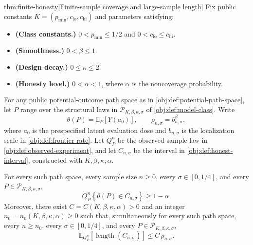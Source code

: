 \documentclass[11pt]{article}
\begin{document}
\begin{theoremv}{thm:finite-honesty}[Finite-sample coverage and large-sample length]
Fix public constants \(K=(p_{\min},c_{\mathrm{lo}},c_{\mathrm{hi}})\) and parameters satisfying:
\begin{itemize}
\item \textbf{(Class constants.)} \(0<p_{\min}\le 1/2\) and \(0<c_{\mathrm{lo}}\le c_{\mathrm{hi}}\).
\item \textbf{(Smoothness.)} \(0<\beta\le 1\).
\item \textbf{(Design decay.)} \(0\le\kappa\le 2\).
\item \textbf{(Honesty level.)} \(0<\alpha<1\), where \(\alpha\) is the noncoverage probability.
\end{itemize}
For any public potential-outcome path space as in \cref{obj:def:potential-path-space}, let \(P\) range over the structural laws in \(\mathcal P_{K,\beta,\kappa,\sigma}\) of \cref{obj:def:model-class}. Write
\[
\theta(P)=\mathbb E_P[Y(a_0)],
\qquad
\rho_{n,\sigma}=b_{n,\sigma}^{\beta},
\]
where \(a_0\) is the prespecified latent evaluation dose and \(b_{n,\sigma}\) is the localization scale in \cref{obj:def:frontier-rate}. Let \(Q_P^n\) be the observed sample law in \cref{obj:def:observed-experiment}, and let \(C_{n,\sigma}\) be the interval in \cref{obj:def:honest-interval}, constructed with \(K,\beta,\kappa,\alpha\).

For every such path space, every sample size \(n\ge 0\), every \(\sigma\in[0,1/4]\), and every \(P\in\mathcal P_{K,\beta,\kappa,\sigma}\),
\[
Q_P^n\!\left\{\theta(P)\in C_{n,\sigma}\right\}\ge 1-\alpha.
\]
Moreover, there exist \(C=C(K,\beta,\kappa,\alpha)>0\) and an integer \(n_0=n_0(K,\beta,\kappa,\alpha)\ge 0\) such that, simultaneously for every such path space, every \(n\ge n_0\), every \(\sigma\in[0,1/4]\), and every \(P\in\mathcal P_{K,\beta,\kappa,\sigma}\),
\[
\mathbb E_{Q_P^n}\!\left[\operatorname{length}(C_{n,\sigma})\right]
\le C\,\rho_{n,\sigma}.
\]
\end{theoremv}
\end{document}
